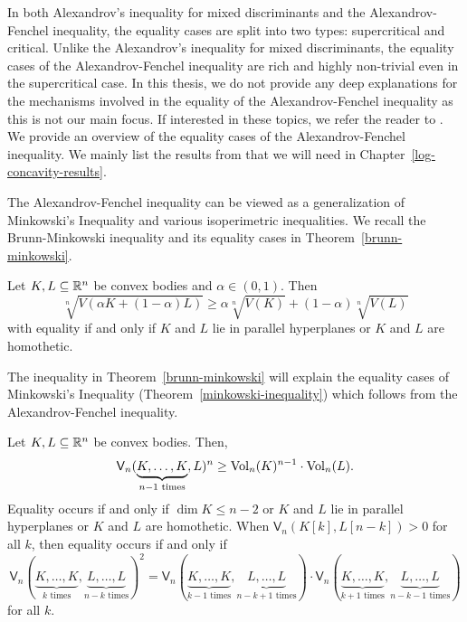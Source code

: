 \documentclass{puthesis-UG}
\begin{document}
In both Alexandrov's inequality for mixed discriminants and the Alexandrov-Fenchel inequality, the equality cases are split into two types: supercritical and critical. Unlike the Alexandrov's inequality for mixed discriminants, the equality cases of the Alexandrov-Fenchel inequality are rich and highly non-trivial even in the supercritical case. In this thesis, we do not provide any deep explanations for the mechanisms involved in the equality of the Alexandrov-Fenchel inequality as this is not our main focus. If interested in these topics, we refer the reader to \cite{minkowski-quadratic-inequality,shenfeld2022extremals}. We provide an overview of the equality cases of the Alexandrov-Fenchel inequality. We mainly list the results from \cite{shenfeld2022extremals} that we will need in Chapter~\ref{log-concavity-results}.

The Alexandrov-Fenchel inequality can be viewed as a generalization of Minkowski's Inequality and various isoperimetric inequalities. We recall the Brunn-Minkowski inequality and its equality cases in Theorem~\ref{brunn-minkowski}.
\begin{thm} \label{brunn-minkowski}
	Let $K, L \subseteq \mathbb{R}^n$ be convex bodies and $\alpha \in (0, 1)$. Then
	\[
		\sqrt[n]{V(\alpha K + (1-\alpha) L)} \geq \alpha \sqrt[n]{V(K)} + (1-\alpha) \sqrt[n]{V(L)}
	\]
	with equality if and only if $K$ and $L$ lie in parallel hyperplanes or $K$ and $L$ are homothetic. 
\end{thm}

The inequality in Theorem~\ref{brunn-minkowski} will explain the equality cases of Minkowski's Inequality (Theorem~\ref{minkowski-inequality}) which follows from the Alexandrov-Fenchel inequality.

\begin{thm} \label{minkowski-inequality}
	Let $K, L \subseteq \mathbb{R}^n$ be convex bodies. Then, 
	\[
		\mathsf{V}_n(\underbrace{K, \ldots, K}_{n-1 \text{ times}}, L)^n \geq \operatorname{Vol}_n(K)^{n-1} \cdot \operatorname{Vol}_n(L).
	\]
	Equality occurs if and only if $\dim K \leq n-2$ or $K$ and $L$ lie in parallel hyperplanes or $K$ and $L$ are homothetic. When $\mathsf{V}_n(K[k], L[n-k]) > 0$ for all $k$, then equality occurs if and only if 
	\[
		\mathsf{V}_n(\underbrace{K, \ldots, K}_{k \text{ times}}, \underbrace{L, \ldots, L}_{n-k \text{ times}})^2 = \mathsf{V}_n(\underbrace{K, \ldots, K}_{k-1 \text{ times}}, \underbrace{L, \ldots, L}_{n-k+1 \text{ times}}) \cdot \mathsf{V}_n(\underbrace{K, \ldots, K}_{k+1 \text{ times}}, \underbrace{L, \ldots, L}_{n-k-1 \text{ times}})
	\]
	for all $k$. 
\end{thm}
\end{document}
